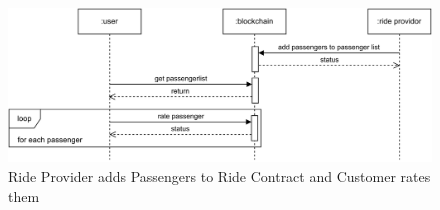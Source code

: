 




















\begin{figure}
    \centering
    \includegraphics[width=\linewidth]{data/8.svg}
    \caption{Ride Provider adds Passengers to Ride Contract and Customer rates them}
    \label{fig:directSVG}
\end{figure}



